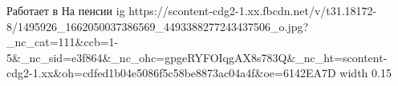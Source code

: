  
 
 
 
 

\par
Работает в На пенсии
\ifcmt
  ig https://scontent-cdg2-1.xx.fbcdn.net/v/t31.18172-8/1495926_1662050037386569_4493388277243437506_o.jpg?_nc_cat=111&ccb=1-5&_nc_sid=e3f864&_nc_ohc=gpgeRYFOIqgAX8s783Q&_nc_ht=scontent-cdg2-1.xx&oh=cdfed1b04e5086f5c58be8873ac04a4f&oe=6142EA7D
  width 0.15
\fi

